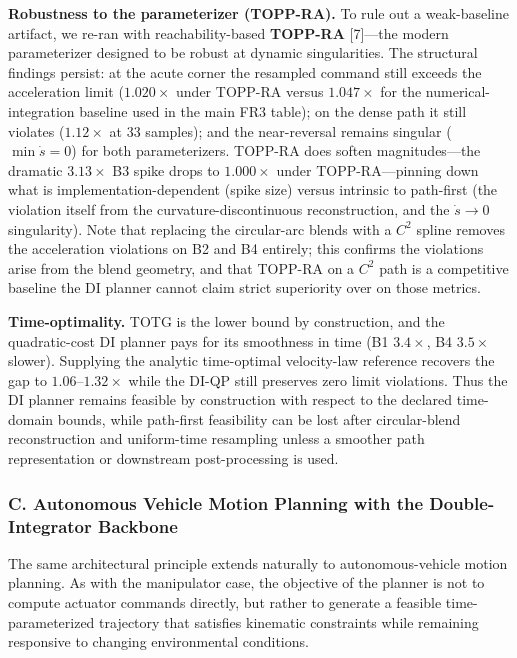 \textbf{Robustness to the parameterizer (TOPP-RA).} To rule out a
weak-baseline artifact, we re-ran with reachability-based
\textbf{TOPP-RA} {[}7{]}---the modern parameterizer designed to be
robust at dynamic singularities. The structural findings persist: at the
acute corner the resampled command still exceeds the acceleration limit
(\(1.020\times\) under TOPP-RA versus \(1.047\times\) for the
numerical-integration baseline used in the main FR3 table); on the dense
path it still violates (\(1.12\times\) at 33 samples); and the
near-reversal remains singular (\(\min\dot s = 0\)) for both
parameterizers. TOPP-RA does soften magnitudes---the dramatic
\(3.13\times\) B3 spike drops to \(1.000\times\) under TOPP-RA---pinning
down what is implementation-dependent (spike size) versus intrinsic to
path-first (the violation itself from the curvature-discontinuous
reconstruction, and the \(\dot s\to0\) singularity). Note that replacing
the circular-arc blends with a \(C^2\) spline removes the acceleration
violations on B2 and B4 entirely; this confirms the violations arise
from the blend geometry, and that TOPP-RA on a \(C^2\) path is a
competitive baseline the DI planner cannot claim strict superiority over
on those metrics.

\textbf{Time-optimality.} TOTG is the lower bound by construction, and
the quadratic-cost DI planner pays for its smoothness in time (B1
\(3.4\times\), B4 \(3.5\times\) slower). Supplying the analytic
time-optimal velocity-law reference recovers the gap to
\(1.06\)--\(1.32\times\) while the DI-QP still preserves zero limit
violations. Thus the DI planner remains feasible by construction with
respect to the declared time-domain bounds, while path-first feasibility
can be lost after circular-blend reconstruction and uniform-time
resampling unless a smoother path representation or downstream
post-processing is used.

\subsubsection{C. Autonomous Vehicle Motion Planning with the
Double-Integrator
Backbone}\label{c.-autonomous-vehicle-motion-planning-with-the-double-integrator-backbone}

The same architectural principle extends naturally to autonomous-vehicle
motion planning. As with the manipulator case, the objective of the
planner is not to compute actuator commands directly, but rather to
generate a feasible time-parameterized trajectory that satisfies
kinematic constraints while remaining responsive to changing
environmental conditions.

